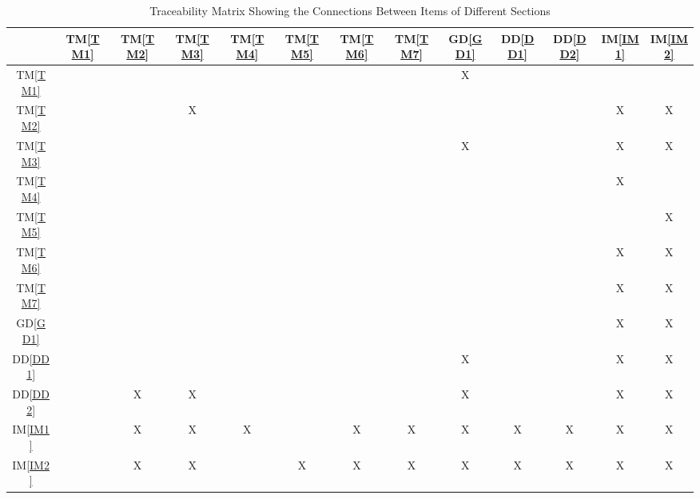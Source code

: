 \documentclass[12pt]{article}
\newcommand{\dref}[1]{GD\ref{#1}}
\newcommand{\ddref}[1]{DD\ref{#1}}
\newcommand{\tref}[1]{TM\ref{#1}}
\newcommand{\iref}[1]{IM\ref{#1}}
\begin{document}
\begin{table}[h!]
\centering
\begin{tabular}{|c|c|c|c|c|c|c|c|c|c|c|c|c|}
\hline
            & \tref{TM1} & \tref{TM2} & \tref{TM3} & \tref{TM4} & \tref{TM5} & \tref{TM6} & \tref{TM7} & \dref{GD1} & \ddref{DD1} & \ddref{DD2} & \iref{IM1} & \iref{IM2} \\
\hline
\tref{TM1}  &            &            &            &            &            &            &            &     X      &             &             &            &            \\ \hline
\tref{TM2}  &            &            &      X     &            &            &            &            &            &             &             &      X     &   X        \\ \hline
\tref{TM3}  &            &            &            &            &            &            &            &     X      &             &             &      X     &     X      \\ \hline
\tref{TM4}  &            &            &            &            &            &            &            &            &             &             &      X     &            \\ \hline
\tref{TM5}  &            &            &            &            &            &            &            &            &             &             &            &     X      \\ \hline
\tref{TM6}  &            &            &            &            &            &            &            &            &             &             &   X        &    X       \\ \hline
\tref{TM7}  &            &            &            &            &            &            &            &            &             &             &      X     &     X      \\ \hline
\dref{GD1}  &            &            &            &            &            &            &            &            &             &             &      X     &     X      \\ \hline
\ddref{DD1} &            &            &            &            &            &            &            &      X     &             &             &      X     &     X      \\ \hline
\ddref{DD2} &            &   X        &  X         &            &            &            &            &      X     &             &             &         X  &  X         \\ \hline
\iref{IM1}  &            &    X       &    X       &    X       &            &    X       &     X      &      X     &     X       &     X       &     X      &  X         \\ \hline
\iref{IM2}  &            &    X       &    X       &            &    X       &    X       &     X      &      X     &     X       &     X       &     X      &  X         \\ \hline
\end{tabular}
\caption{Traceability Matrix Showing the Connections Between Items of Different Sections}
\label{Table:trace}
\end{table}
\end{document}

